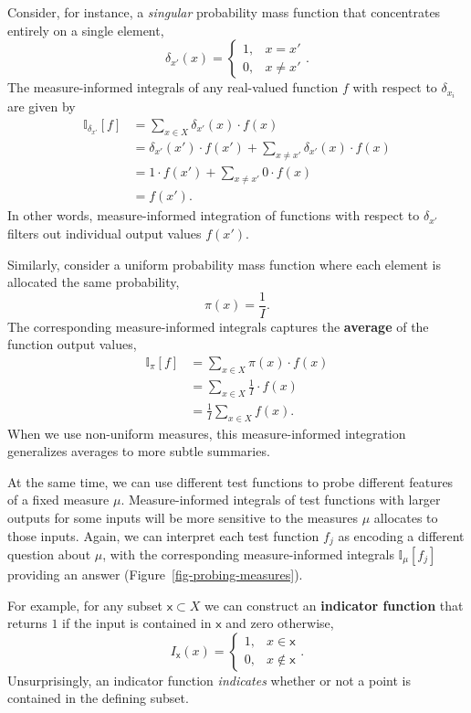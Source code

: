 \documentclass[
  letterpaper,
  DIV=11,
  numbers=noendperiod]{scrartcl}
\begin{document}
Consider, for instance, a \emph{singular} probability mass function that
concentrates entirely on a single element, \[
\delta_{x'} (x) =
\left\{
\begin{array}{rr}
1, & x = x' \\
0, & x \neq x'
\end{array}
\right. .
\] The measure-informed integrals of any real-valued function \(f\) with
respect to \(\delta_{x_{i}}\) are given by \begin{align*}
\mathbb{I}_{\delta_{x'}}[f]
&= \sum_{x \in X} \delta_{x'}(x) \cdot f(x)
\\
&= \delta_{x'}(x') \cdot f(x')
  + \sum_{x \neq x'} \delta_{x'}(x) \cdot f(x)
\\
&=  1 \cdot f(x')
  + \sum_{x \neq x'} 0 \cdot f(x)
\\
&= f(x').
\end{align*} In other words, measure-informed integration of functions
with respect to \(\delta_{x'}\) filters out individual output values
\(f(x')\).

Similarly, consider a uniform probability mass function where each
element is allocated the same probability, \[
\pi(x) = \frac{1}{I}.
\] The corresponding measure-informed integrals captures the
\textbf{average} of the function output values, \begin{align*}
\mathbb{I}_{\pi}[f]
&= \sum_{x \in X} \pi(x) \cdot f(x)
\\
&= \sum_{x \in X} \frac{1}{I} \cdot f(x)
\\
&= \frac{1}{I} \sum_{x \in X} f(x).
\end{align*} When we use non-uniform measures, this measure-informed
integration generalizes averages to more subtle summaries.

At the same time, we can use different test functions to probe different
features of a fixed measure \(\mu\). Measure-informed integrals of test
functions with larger outputs for some inputs will be more sensitive to
the measures \(\mu\) allocates to those inputs. Again, we can interpret
each test function \(f_{j}\) as encoding a different question about
\(\mu\), with the corresponding measure-informed integrals
\(\mathbb{I}_{\mu}[f_{j}]\) providing an answer
(Figure~\ref{fig-probing-measures}).

For example, for any subset \(\mathsf{x} \subset X\) we can construct an
\textbf{indicator function} that returns \(1\) if the input is contained
in \(\mathsf{x}\) and zero otherwise, \[
I_{\mathsf{x}} (x) =
\left\{
\begin{array}{rr}
1, & x \in \mathsf{x} \\
0, & x \notin \mathsf{x}
\end{array}
\right. .
\] Unsurprisingly, an indicator function \emph{indicates} whether or not
a point is contained in the defining subset.
\end{document}
